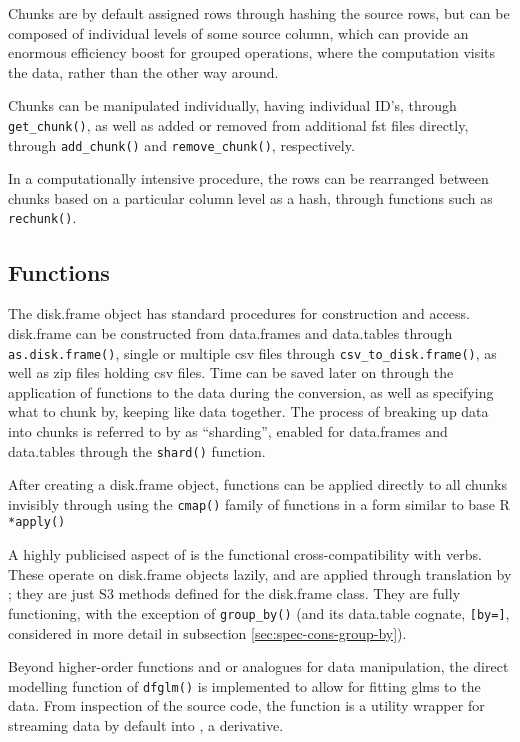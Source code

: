 Chunks are by default assigned rows through hashing the source rows, but
can be composed of individual levels of some source column, which can
provide an enormous efficiency boost for grouped operations, where the
computation visits the data, rather than the other way around.

Chunks can be manipulated individually, having individual ID's, through
\texttt{get_chunk()}, as well as added or
removed from additional fst files directly, through
\texttt{add_chunk()} and
\texttt{remove_chunk()}, respectively.

In a computationally intensive procedure, the rows can be rearranged
between chunks based on a particular column level as a hash, through
functions such as \texttt{rechunk()}.

\hypertarget{sec:functions}{%
    \subsection{Functions}\label{sec:functions}}

The disk.frame object has standard procedures for construction and
access. disk.frame can be constructed from data.frames and data.tables
through \texttt{as.disk.frame()}, single or
multiple csv files through
\texttt{csv_to_disk.frame()}, as well as zip
files holding csv files. Time can be saved later on through the
application of functions to the data during the conversion, as well as
specifying what to chunk by, keeping like data together. The process of
breaking up data into chunks is referred to by  as
``sharding'', enabled for data.frames and data.tables through the
\texttt{shard()} function.

After creating a disk.frame object, functions can be applied directly to
all chunks invisibly through using the
\texttt{cmap()} family of functions in a form
similar to base R \texttt{*apply()}

A highly publicised aspect of  is the functional
cross-compatibility with  verbs. These operate on disk.frame
objects lazily, and are applied through translation by ; they
are just S3 methods defined for the disk.frame class. They are fully
functioning, with the exception of \texttt{group_by()} (and its
data.table cognate, \texttt{[by=]}, considered in more detail in
subsection \cref{sec:spec-cons-group-by}).

Beyond higher-order functions and  or  analogues for data
manipulation, the direct modelling function of
\texttt{dfglm()} is implemented to allow for
fitting glms to the data. From inspection of the source code, the
function is a utility wrapper for streaming  data by default
into , a  derivative.

